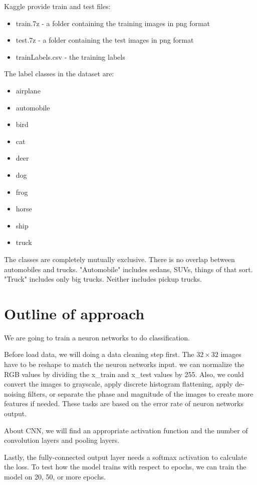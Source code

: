 \documentclass{article}
\begin{document}
Kaggle provide train and test files:
\begin{itemize}
    \item train.7z - a folder containing the training images in png format
    \item test.7z - a folder containing the test images in png format
    \item trainLabels.csv - the training labels
\end{itemize}

The label classes in the dataset are:
\begin{itemize}
    \item airplane 
    \item automobile 
    \item bird 
    \item cat 
    \item deer 
    \item dog 
    \item frog 
    \item horse 
    \item ship 
    \item truck
\end{itemize}

The classes are completely mutually exclusive. There is no overlap between automobiles and trucks. "Automobile" includes sedans, SUVs, things of that sort. "Truck" includes only big trucks. Neither includes pickup trucks.

\section{Outline of approach}
\hspace{1.5em}We are going to train a neuron networks to do classification.

Before load data, we will doing a data cleaning step first. The $32\times32$ images have to be reshape to match the neuron networks input.
we can normalize the RGB values by dividing the x\_train and x\_test values by 255.
Also, we could convert the images to grayscale, apply discrete histogram flattening, apply de-noising filters, or separate the phase and magnitude of the images to create more features if needed. These tasks are based on the error rate of neuron networks output.

About CNN, we will find an appropriate activation function and the number of convolution layers and pooling layers.

Lastly, the fully-connected output layer needs a softmax activation to calculate the loss. To test how the model trains with respect to epochs, we can train the model on 20, 50, or more epochs.
\end{document}

